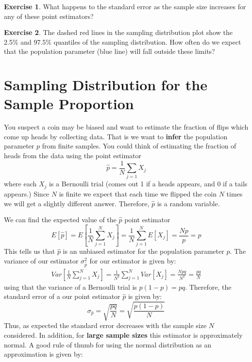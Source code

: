 \documentclass[
]{book}
\theoremstyle{definition}
\theoremstyle{definition}
\theoremstyle{definition}
\newtheorem{exercise}{Exercise}[chapter]
\theoremstyle{definition}
\theoremstyle{remark}
\begin{document}
\begin{exercise}
\protect\hypertarget{exr:unnamed-chunk-348}{}\label{exr:unnamed-chunk-348}What happens to the standard error as the sample size increases for any of these point estimators?
\end{exercise}

\begin{exercise}
\protect\hypertarget{exr:unnamed-chunk-349}{}\label{exr:unnamed-chunk-349}The dashed red lines in the sampling distribution plot show the 2.5\% and 97.5\% quantiles of the sampling distribution. How often do we expect that the population parameter (blue line) will fall outside these limits?
\end{exercise}

\hypertarget{sampling-distribution-for-the-sample-proportion}{%
\section{Sampling Distribution for the Sample Proportion}\label{sampling-distribution-for-the-sample-proportion}}

You suspect a coin may be biased and want to estimate the fraction of flips which come up heads by collecting data. That is we want to \textbf{infer} the population parameter \(p\) from finite samples. You could think of estimating the fraction of heads from the data using the point estimator \[\hat{p}=\frac{1}{N} \sum_{j=1} X_j\] where each \(X_j\) is a Bernoulli trial (comes out 1 if a heads appears, and 0 if a tails appears.) Since \(N\) is finite we expect that each time we flipped the coin \(N\) times we will get a slightly different answer. Therefore, \(\hat{p}\) is a random variable.

We can find the expected value of the \(\hat{p}\) point estimator \[E[\hat{p}]=E\left[\frac{1}{N} \sum_{j=1}^N X_j \right]=\frac{1}{N} \sum_{j=1}^N E[X_j]=\frac{Np}{p}=p\] This tells us that \(\hat{p}\) is an unbiased estimator for the population parameter \(p\). The variance of our estimator \(\sigma^2_{\hat{p}}\) for our estimator is given by:
\begin{align}
Var\left[\frac{1}{N} \sum_{j=1}^N X_j \right]=\frac{1}{N^2} \sum_{j=1}^N Var[X_j]=\frac{Npq}{N^2}=\frac{pq}{N}
\end{align}
using that the variance of a Bernoulli trial is \(p(1-p)=pq\). Therefore, the standard error of a our point estimator \(\hat{p}\) is given by:
\[\sigma_{\hat{p}}=\sqrt{\frac{pq}{N}}=\sqrt{\frac{p(1-p)}{N}}\]
Thus, as expected the standard error decreases with the sample size \(N\) considered. In addition, for \textbf{large sample sizes} this estimator is approximately normal. A good rule of thumb for using the normal distribution as an approximation is given by:
\end{document}
